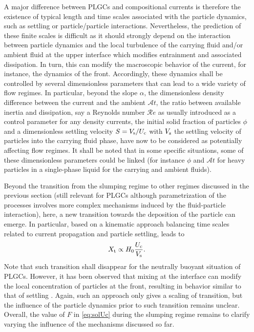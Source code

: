 \documentclass[12pt]{article}
\begin{document}
A major difference between PLGCs and compositional currents is therefore the existence of typical length and time scales associated with the particle dynamics, such as settling or particle/particle interactions. Nevertheless, the prediction of these finite scales is difficult as it should strongly depend on the interaction between particle dynamics and the local turbulence of the carrying fluid and/or ambient fluid at the upper interface which modifies entrainment and associated dissipation. In turn, this can modify the macroscopic behavior of the current, for instance, the dynamics of the front. Accordingly, these dynamics shall be controlled by several dimensionless parameters that can lead to a wide variety of flow regimes. In particular, beyond the slope $\alpha$, the dimensionless density difference between the current and the ambient $\mathcal{A}t$, the ratio between available inertia and dissipation, say a Reynolds number $\mathcal{R}e$ as usually introduced as a control parameter for any density currents, the initial solid fraction of particles $\phi$ and a dimensionless settling velocity $S=V_{\text s}/U_{\text{c}}$ with $V_{\text s}$ the settling velocity of particles into the carrying fluid phase, have now to be considered as potentially affecting flow regimes. It shall be noted that in some specific situations, some of these dimensionless parameters could be linked (for instance $\phi$ and $\mathcal{A}t$ for heavy particles in a single-phase liquid for the carrying and ambient fluids).

Beyond the transition from the slumping regime to other regimes discussed in the previous section (still relevant for PLGCs although parametrization of the processes involves more complex mechanisms induced by the fluid-particle interaction), here, a new transition towards the deposition of the particle can emerge. In particular, based on a kinematic approach balancing time scales related to current propagation and particle settling, leads to
%
\begin{equation}
	\label{eq:Xt_settling}
	X_{\text t} \propto H_0\frac{U_{\text{c}}}{V_{\text s}}.
\end{equation}
%
Note that such transition shall disappear for the neutrally buoyant situation of PLGCs.
However, it has been observed that mixing at the interface can modify the local concentration of particles at the front, resulting in behavior similar to that of settling \cite{Schneider2023}. Again, such an approach only gives a scaling of transition, but the influence of the particle dynamics prior to such transition remains unclear. Overall, the value of $F$ in \eqref{eq:solUc} during the slumping regime remains to clarify varying the influence of the mechanisms discussed so far.
\end{document}
